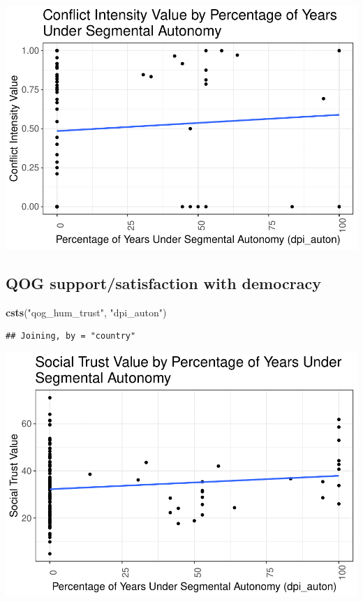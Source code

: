 \documentclass[
]{article}
\newenvironment{Shaded}{\begin{snugshade}}{\end{snugshade}}
\newcommand{\KeywordTok}[1]{\textcolor[rgb]{0.13,0.29,0.53}{\textbf{#1}}}
\newcommand{\NormalTok}[1]{#1}
\newcommand{\StringTok}[1]{\textcolor[rgb]{0.31,0.60,0.02}{#1}}
\begin{document}
\includegraphics{03_tjbrailey_data_analysis_files/figure-latex/unnamed-chunk-2-1.pdf}

\hypertarget{qog-supportsatisfaction-with-democracy}{%
\subsection{QOG support/satisfaction with
democracy}\label{qog-supportsatisfaction-with-democracy}}

\begin{Shaded}
\begin{Highlighting}[]
\KeywordTok{csts}\NormalTok{(}\StringTok{"qog_hum_trust"}\NormalTok{, }\StringTok{"dpi_auton"}\NormalTok{)}
\end{Highlighting}
\end{Shaded}

\begin{verbatim}
## Joining, by = "country"
\end{verbatim}

\includegraphics{03_tjbrailey_data_analysis_files/figure-latex/unnamed-chunk-3-1.pdf}
\end{document}
